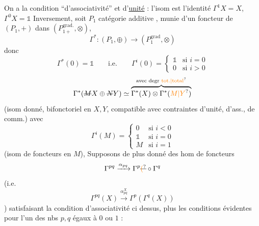 On a la condition ``d'associativité''
et d'\uline{unité} : l'isom  est l'identité 
 $\Gamma^1 X=X$, $\Gamma^0 X=\mathbb{1}$
Inversement, soit $P_1$  catégorie \inserted{$\otimes$}\unsure{-}additive ,
munie d'un  foncteur de $(P_1,+)$
dans $(P_{1+}^{\mathrm{grad.}},\otimes)$, 
\[
\Gamma^*:(P_1,\oplus)\longrightarrow(P_1^{\mathrm{grad}},\otimes)
\]
donc
\[
\Gamma^*(0)=\mathbb{1}\qquad\text{i.e.}\qquad
\Gamma^i(0)=\begin{cases}\mathbb{1}&\text{si }i=0\\0&\text{si }i>0\end{cases}
\]
\[
\Gamma^*(\deleted{M}X\oplus\deleted{N}Y)\simeq
\overbrace{\Gamma^*(X)\otimes\Gamma^*(\unsure{M|Y})}^{\text{avec degr \unsure{tot.|total}}}
\]
(isom  donné, bifonctoriel en $X,Y$, compatible
avec contraintes d'unité, d'ass., de comm.)
avec
\[
\Gamma^i(M)=\begin{cases}0&\text{si }i<0\\\mathbb{1}&\text{si }i=0\\M&\text{si }i=1\end{cases}
\]
(isom de foncteurs en $M$), Supposons de
plus donné des hom de foncteurs
\[
\Gamma^{pq}\xrightarrow{\alpha_{pq}}\Gamma^p\deleted{\unsure{(}}\circ\Gamma^q
\]
(i.e.
\[
\Gamma^{pq}(X)\xrightarrow{\alpha_{pq}^X}\Gamma^p(\Gamma^q(X))
\]
)
satisfaisant la condition d'associativité
ci dessus, plus les conditions
évidentes pour  l'un des nbs $p,q$
égaux à $0$ ou $1$ :
